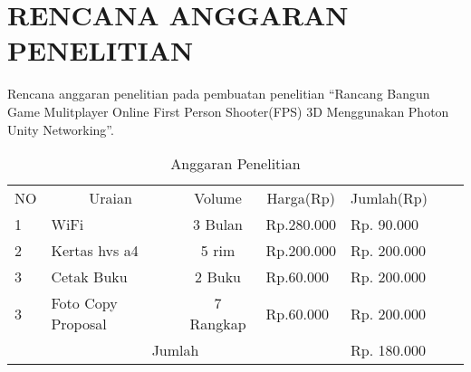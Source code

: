 \chapter*{RENCANA ANGGARAN PENELITIAN}
Rencana anggaran penelitian pada pembuatan penelitian “Rancang Bangun Game Mulitplayer Online First Person Shooter(FPS) 3D Menggunakan Photon Unity Networking”.

\begin{table}[h]
    \centering
    \begin{tabular}{|llcl|l|ll}
    \cline{1-5}
    \multicolumn{1}{|c|}{NO} & \multicolumn{1}{c|}{Uraian}          & \multicolumn{1}{c|}{Volume}  & \multicolumn{1}{c|}{Harga(Rp)} & Jumlah(Rp)    &  &  \\ \cline{1-5}
    \multicolumn{1}{|l|}{1}  & \multicolumn{1}{l|}{WiFi}           & \multicolumn{1}{c|}{3 Bulan} & Rp.280.000                      & Rp. 90.000  &  &  \\ \cline{1-5}
    \multicolumn{1}{|l|}{2}  & \multicolumn{1}{l|}{Kertas hvs a4}           & \multicolumn{1}{c|}{5 rim} & Rp.200.000                      & Rp. 200.000   &  &  \\ \cline{1-5}
    \multicolumn{1}{|l|}{3}  & \multicolumn{1}{l|}{Cetak Buku}           & \multicolumn{1}{c|}{2 Buku} & Rp.60.000                      & Rp. 200.000   &  &  \\ \cline{1-5}
    \multicolumn{1}{|l|}{3}  & \multicolumn{1}{l|}{Foto Copy Proposal}           & \multicolumn{1}{c|}{7 Rangkap} & Rp.60.000                      & Rp. 200.000   &  &  \\ \cline{1-5}
    \multicolumn{4}{|c|}{Jumlah}                                                                                                    & Rp. 180.000 &  &  \\ \cline{1-5}
    \end{tabular}
    \caption{Anggaran Penelitian}
    \label{lab:label-anggaran}
    \end{table}